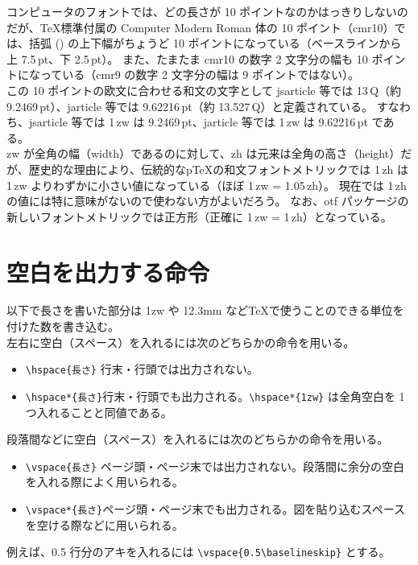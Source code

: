 コンピュータのフォントでは、どの長さが 10 ポイントなのかはっきりしないのだが、\TeX{}標準付属の Computer Modern Roman 体の 10 ポイント（cmr10）では、括弧 (\hspc{+1.00pt}) の上下幅がちょうど 10 ポイントになっている（ベースラインから上 7.5\,pt、下 2.5\,pt）。
また、たまたま cmr10 の数字 2 文字分の幅も 10 ポイントになっている（cmr9 の数字 2 文字分の幅は 9 ポイントではない）。\\

この 10 ポイントの欧文に合わせる和文の文字として jsarticle 等では 13\,Q（約 9.2469\,pt）、jarticle 等では 9.62216\,pt（約 13.527\,Q）と定義されている。\enlargethispage{+1.00zw}
すなわち、jsarticle 等では 1\,zw は 9.2469\,pt、jarticle 等では 1\,zw は 9.62216\,pt である。\\

zw が全角の幅（width）であるのに対して、zh は元来は全角の高さ（height）だが、歴史的な理由により、伝統的なp\TeX{}の和文フォントメトリックでは 1\,zh は 1\,zw よりわずかに小さい値になっている（ほぼ 1\,zw = 1.05\,zh）。
現在では 1\,zh の値には特に意味がないので使わない方がよいだろう。
なお、otf パッケージの新しいフォントメトリックでは正方形（正確に 1\,zw = 1\,zh）となっている。
\section{空白を出力する命令}
以下で長さを書いた部分は 1zw や 12.3mm など\TeX{}で使うことのできる単位を付けた数を書き込む。\\

左右に空白（スペース）を入れるには次のどちらかの命令を用いる。
\begin{itemize}\setlength{\leftskip}{-1.00zw}%
\item \verb'\hspace{長さ}' 行末・行頭では出力されない。
\item \verb'\hspace*{長さ}'行末・行頭でも出力される。\verb'\hspace*{1zw}' は全角空白を 1 つ入れることと同値である。
\end{itemize}
段落間などに空白（スペース）を入れるには次のどちらかの命令を用いる。
\begin{itemize}\setlength{\leftskip}{-1.00zw}%
\item \verb'\vspace{長さ}' ページ頭・ページ末では出力されない。段落間に余分の空白を入れる際によく用いられる。
\item \verb'\vspace*{長さ}'ページ頭・ページ末でも出力される。図を貼り込むスペースを空ける際などに用いられる。
\end{itemize}
例えば、0.5 行分のアキを入れるには \verb'\vspace{0.5\baselineskip}' とする。
